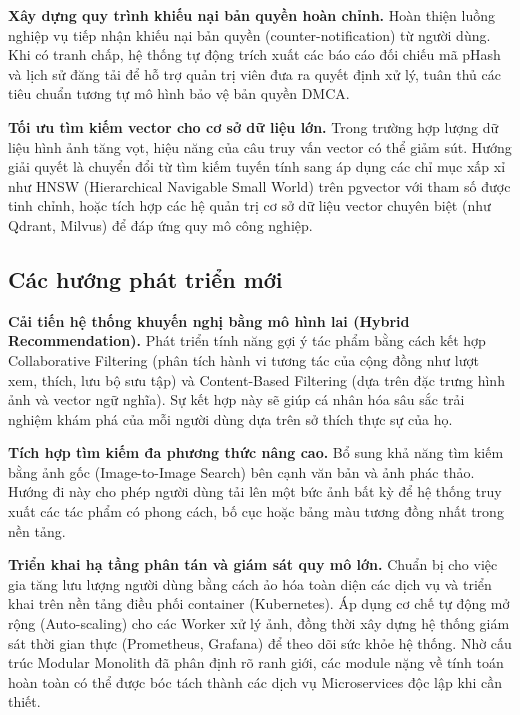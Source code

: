 \textbf{Xây dựng quy trình khiếu nại bản quyền hoàn chỉnh.} Hoàn thiện luồng nghiệp vụ tiếp nhận khiếu nại bản quyền (counter-notification) từ người dùng. Khi có tranh chấp, hệ thống tự động trích xuất các báo cáo đối chiếu mã pHash và lịch sử đăng tải để hỗ trợ quản trị viên đưa ra quyết định xử lý, tuân thủ các tiêu chuẩn tương tự mô hình bảo vệ bản quyền DMCA.

\textbf{Tối ưu tìm kiếm vector cho cơ sở dữ liệu lớn.} Trong trường hợp lượng dữ liệu hình ảnh tăng vọt, hiệu năng của câu truy vấn vector có thể giảm sút. Hướng giải quyết là chuyển đổi từ tìm kiếm tuyến tính sang áp dụng các chỉ mục xấp xỉ như HNSW (Hierarchical Navigable Small World) trên pgvector với tham số được tinh chỉnh, hoặc tích hợp các hệ quản trị cơ sở dữ liệu vector chuyên biệt (như Qdrant, Milvus) để đáp ứng quy mô công nghiệp.

\subsection{Các hướng phát triển mới}

\textbf{Cải tiến hệ thống khuyến nghị bằng mô hình lai (Hybrid Recommendation).} Phát triển tính năng gợi ý tác phẩm bằng cách kết hợp Collaborative Filtering (phân tích hành vi tương tác của cộng đồng như lượt xem, thích, lưu bộ sưu tập) và Content-Based Filtering (dựa trên đặc trưng hình ảnh và vector ngữ nghĩa). Sự kết hợp này sẽ giúp cá nhân hóa sâu sắc trải nghiệm khám phá của mỗi người dùng dựa trên sở thích thực sự của họ.

\textbf{Tích hợp tìm kiếm đa phương thức nâng cao.} Bổ sung khả năng tìm kiếm bằng ảnh gốc (Image-to-Image Search) bên cạnh văn bản và ảnh phác thảo. Hướng đi này cho phép người dùng tải lên một bức ảnh bất kỳ để hệ thống truy xuất các tác phẩm có phong cách, bố cục hoặc bảng màu tương đồng nhất trong nền tảng.

\textbf{Triển khai hạ tầng phân tán và giám sát quy mô lớn.} Chuẩn bị cho việc gia tăng lưu lượng người dùng bằng cách ảo hóa toàn diện các dịch vụ và triển khai trên nền tảng điều phối container (Kubernetes). Áp dụng cơ chế tự động mở rộng (Auto-scaling) cho các Worker xử lý ảnh, đồng thời xây dựng hệ thống giám sát thời gian thực (Prometheus, Grafana) để theo dõi sức khỏe hệ thống. Nhờ cấu trúc Modular Monolith đã phân định rõ ranh giới, các module nặng về tính toán hoàn toàn có thể được bóc tách thành các dịch vụ Microservices độc lập khi cần thiết.

